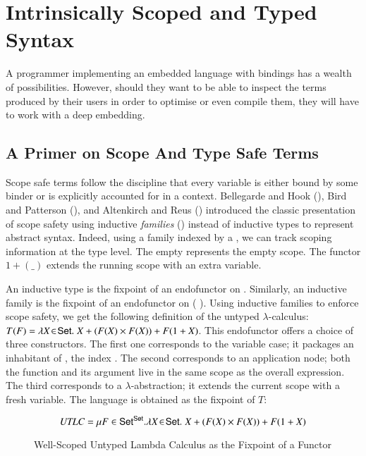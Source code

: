 \chapter{Intrinsically Scoped and Typed Syntax}
\label{sec:scopedtypedterms}

A programmer implementing an embedded language with bindings has a wealth of
possibilities. However, should they want to be able to inspect the terms produced
by their users in order to optimise or even compile them, they will have to work
with a deep embedding.

\section{A Primer on Scope And Type Safe Terms}\label{section:primer-term}

Scope safe terms follow the discipline that every variable is either bound by
some binder or is explicitly accounted for in a context. Bellegarde and Hook
(\citeyear{BELLEGARDE1994287}), Bird and Patterson (\citeyear{bird_paterson_1999}),
and Altenkirch and Reus (\citeyear{altenkirch1999monadic}) introduced the classic
presentation of scope safety using inductive \emph{families}
(\cite{dybjer1994inductive}) instead of inductive types to represent abstract
syntax. Indeed, using a family indexed by a , we can track scoping
information at the type level. The empty  represents the empty scope.
The functor $1 + (\_)$ extends the running scope with an extra variable.

An inductive type is the fixpoint of an endofunctor on . Similarly, an
inductive family is the fixpoint of an endofunctor on ({  }).
Using inductive families to enforce scope safety, we get the following definition
of the untyped $\lambda$-calculus:
$T(F) = \lambda X \!\in\! \AD{Set}.\; X + (F(X) \times F(X)) + F(1 + X)$.
This endofunctor offers a choice of three constructors.  The first one corresponds
to the variable case; it packages an inhabitant of , the index .
The second corresponds to an application node; both the function and its argument
live in the same scope as the overall expression. The third corresponds to a
$\lambda$-abstraction; it extends the current scope with a fresh variable.
The language is obtained as the fixpoint of $T$:

\begin{figure}[h]
\[
   \mathit{UTLC} = \mu F \in \AD{Set}^{\AD{Set}}.
   \lambda X \!\in\! \AD{Set}.\; X + (F(X) \times F(X)) + F(1 + X)
\]
\caption{Well-Scoped Untyped Lambda Calculus as the Fixpoint of a Functor}
\end{figure}


